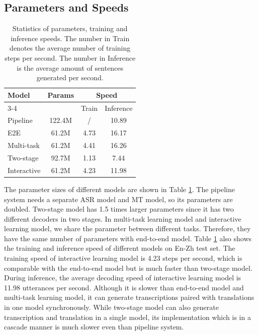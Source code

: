 \documentclass[letterpaper]{article} %
\begin{document}
\subsection{Parameters and Speeds}
\begin{table}[t]
	\centering
	\begin{tabular}{l|c|c|c}
		\hline
		\multirow{2}{*}{Model} & \multirow{2}{*}{Params} & \multicolumn{2}{c}{Speed} \\
		\cline{3-4}
		~                          &            ~            & Train       & Inference        \\
		\hline
		Pipeline               & 122.4M              & /               & 10.89       \\
		E2E           & 61.2M                & 4.73         & 16.17       \\
		Multi-task            & 61.2M                & 4.41         & 16.26       \\
		Two-stage          & 92.7M                & 1.13         & 7.44        \\
		Interactive           & 61.2M                & 4.23        & 11.98       \\ \hline
	\end{tabular}
	\caption{Statistics of parameters, training and inference speeds. The number in Train denotes the average number of training steps per second. The number in Inference is the average amount of sentences generated per second.}
	\label{tbl:parameter}
\end{table}
The parameter sizes of different models are shown in Table \ref{tbl:parameter}. The pipeline system needs a separate ASR model and MT model, so its parameters are doubled.
Two-stage model has 1.5 times larger parameters since it has two different decoders in two stages.
In multi-task learning model and interactive learning model, we share the parameter between different tasks. Therefore, they have the same number of parameters with end-to-end model.
Table \ref{tbl:parameter} also shows the training and inference speed of different models on En-Zh  test set. The training speed of interactive learning model is 4.23 steps per second, which is comparable with the end-to-end model but is much faster than two-stage model. During inference, the average decoding speed of interactive learning model is 11.98 utterances per second. Although it is slower than end-to-end model and multi-task learning model, it can generate transcriptions paired with translations in one model synchronously. While two-stage model can also generate transcription and translation in a single model, its implementation which is in a cascade manner is much slower even than pipeline system.
\end{document}
